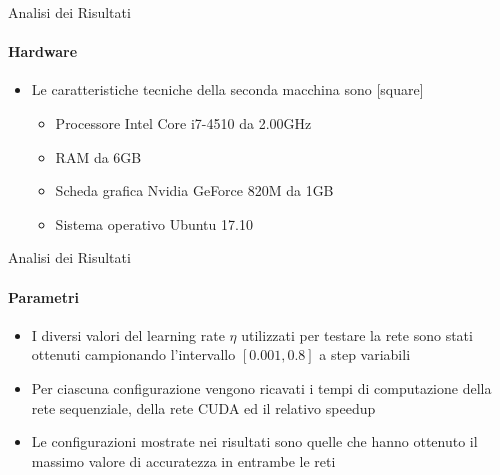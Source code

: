 \documentclass[
 ]{beamer}
\begin{document}
\begin{frame}{Analisi dei Risultati}
    \framesubtitle{Hardware}
    \smallskip
    \begin{itemize} [<+->]
        \setlength\itemsep{2em}
        \item \large Le caratteristiche tecniche della seconda macchina sono            
        \bigskip
        [square] 
        \begin{itemize} [<+->] 
        \setlength\itemsep{2.5em}
            \item \large Processore Intel Core i7-4510 da 2.00GHz
            \item \large RAM da 6GB
            \item \large Scheda grafica Nvidia GeForce 820M da 1GB
            \item \large Sistema operativo Ubuntu 17.10                    
        \end{itemize}        
    \end{itemize}     
\end{frame}

\begin{frame}{Analisi dei Risultati}
    \framesubtitle{Parametri}
    \smallskip
    \begin{itemize} [<+->]
        \setlength\itemsep{2.5em}
        \item \large I diversi valori del learning rate $\eta$ utilizzati per testare la rete sono stati ottenuti campionando l'intervallo $[0.001, 0.8]$ a step variabili
        \item \large Per ciascuna configurazione vengono ricavati i tempi di computazione della rete sequenziale, della rete CUDA ed il relativo speedup
        \item \large Le configurazioni mostrate nei risultati sono quelle che hanno ottenuto il massimo valore di accuratezza in entrambe le reti
    \end{itemize}     
\end{frame}
\end{document}
